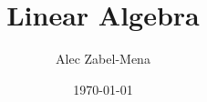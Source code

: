 \documentclass[12pt, twoside]{book}
\title{Linear Algebra}
\author{Alec Zabel-Mena}
\date{\today}
\begin{document}
\maketitle
\tableofcontents
\newpage






\nocite{*}



\end{document}

